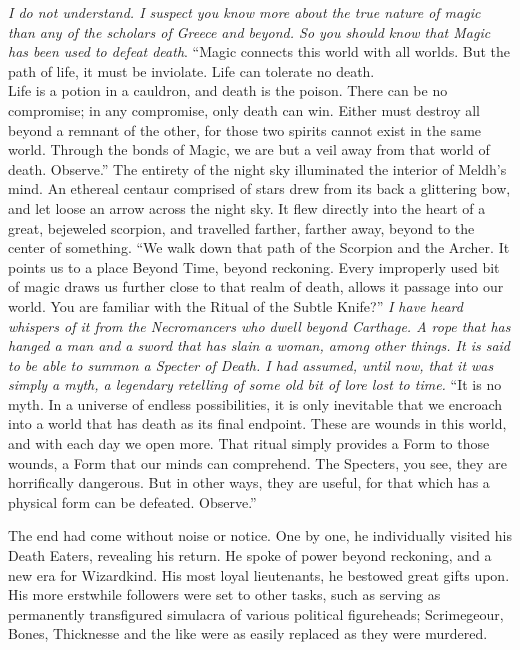 \begin{flushright}
\SmallVSpace
\emph{I do not understand. I suspect you know more about the true nature of magic than any of the scholars of Greece and beyond. So you should know that Magic has been used to defeat death}.
\SmallVSpace
“Magic connects this world with all worlds. But the path of life, it must be inviolate. Life can tolerate no death.\\Life is a potion in a cauldron, and death is the poison. There can be no compromise; in any compromise, only death can win. Either must destroy all beyond a remnant of the other, for those two spirits cannot exist in the same world. Through the bonds of Magic, we are but a veil away from that world of death. Observe.”
\SmallVSpace
The entirety of the night sky illuminated the interior of Meldh’s mind. An ethereal centaur comprised of stars drew from its back a glittering bow, and let loose an arrow across the night sky. It flew directly into the heart of a great, bejeweled scorpion, and travelled farther, farther away, beyond to the center of something.
\SmallVSpace
“We walk down that path of the Scorpion and the Archer. It points us to a place Beyond Time, beyond reckoning. Every improperly used bit of magic draws us further close to that realm of death, allows it passage into our world. You are familiar with the Ritual of the Subtle Knife?”
\SmallVSpace
\emph{I have heard whispers of it from the Necromancers who dwell beyond Carthage. A rope that has hanged a man and a sword that has slain a woman, among other things. It is said to be able to summon a Specter of Death. I had assumed, until now, that it was simply a myth, a legendary retelling of some old bit of lore lost to time.}
\SmallVSpace
“It is no myth. In a universe of endless possibilities, it is only inevitable that we encroach into a world that has death as its final endpoint. These are wounds in this world, and with each day we open more. That ritual simply provides a Form to those wounds, a Form that our minds can comprehend. The Specters, you see, they are horrifically dangerous. But in other ways, they are useful, for that which has a physical form can be defeated. Observe.”
\end{flushright}
\simpleline
{}
The end had come without noise or notice. One by one, he individually visited his Death Eaters, revealing his return. He spoke of power beyond reckoning, and a new era for Wizardkind. His most loyal lieutenants, he bestowed great gifts upon. His more erstwhile followers were set to other tasks, such as serving as permanently transfigured simulacra of various political figureheads; Scrimegeour, Bones, Thicknesse and the like were as easily replaced as they were murdered.

